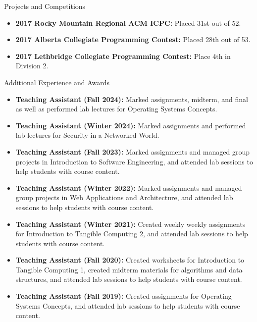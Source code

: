 \documentclass[]{mcdowellcv}
\begin{document}
\newpage

\begin{cvsection}{Projects and Competitions}
  \begin{cvsubsection}{}{}{}
    \begin{itemize}
      \item \textbf{2017 Rocky Mountain Regional ACM ICPC:} Placed 31st out of 52.
      \item \textbf{2017 Alberta Collegiate Programming Contest:} Placed 28th out of 53.
      \item \textbf{2017 Lethbridge Collegiate Programming Contest:} Place 4th in Division 2.
    \end{itemize}
  \end{cvsubsection}
\end{cvsection}

\vspace*{-10pt}

\begin{cvsection}{Additional Experience and Awards}
  \begin{cvsubsection}{}{}{}	
    \begin{itemize}
      \item \textbf{Teaching Assistant (Fall 2024):} Marked assignments, midterm, and final as well as performed lab lectures for Operating Systems Concepts.
      \item \textbf{Teaching Assistant (Winter 2024):} Marked assignments and performed lab lectures for Security in a Networked World.
      \item \textbf{Teaching Assistant (Fall 2023):} Marked assignments and managed group projects in Introduction to Software Engineering, and attended lab sessions to help students with course content.
      \item \textbf{Teaching Assistant (Winter 2022):} Marked assignments and managed group projects in Web Applications and Architecture, and attended lab sessions to help students with course content.
      \item \textbf{Teaching Assistant (Winter 2021):} Created weekly weekly assignments for Introduction to Tangible Computing 2, and attended lab sessions to help students with course content.
      \item \textbf{Teaching Assistant (Fall 2020):} Created worksheets for Introduction to Tangible Computing 1, created midterm materials for algorithms and data structures, and attended lab sessions to help students with course content.
      \item \textbf{Teaching Assistant (Fall 2019):} Created assignments for Operating Systems Concepts, and attended lab sessions to help students with course content.
    \end{itemize}
  \end{cvsubsection}
\end{cvsection}
\end{document}
